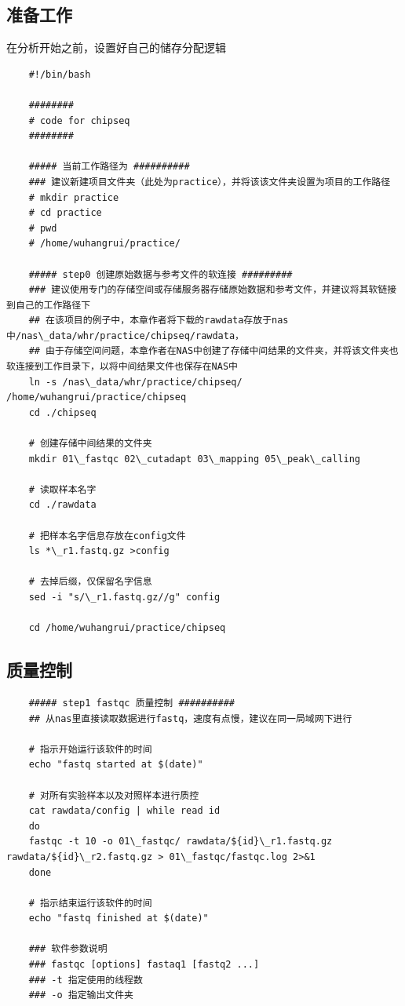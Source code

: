 \subsection{准备工作}
在分析开始之前，设置好自己的储存分配逻辑
\begin{lstlisting}
    #!/bin/bash

    ########
    # code for chipseq
    ########

    ##### 当前工作路径为 ##########
    ### 建议新建项目文件夹（此处为practice），并将该该文件夹设置为项目的工作路径
    # mkdir practice
    # cd practice
    # pwd
    # /home/wuhangrui/practice/

    ##### step0 创建原始数据与参考文件的软连接 #########
    ### 建议使用专门的存储空间或存储服务器存储原始数据和参考文件，并建议将其软链接到自己的工作路径下
    ## 在该项目的例子中，本章作者将下载的rawdata存放于nas中/nas\_data/whr/practice/chipseq/rawdata，
    ## 由于存储空间问题，本章作者在NAS中创建了存储中间结果的文件夹，并将该文件夹也软连接到工作目录下，以将中间结果文件也保存在NAS中
    ln -s /nas\_data/whr/practice/chipseq/ /home/wuhangrui/practice/chipseq
    cd ./chipseq

    # 创建存储中间结果的文件夹 
    mkdir 01\_fastqc 02\_cutadapt 03\_mapping 05\_peak\_calling

    # 读取样本名字
    cd ./rawdata

    # 把样本名字信息存放在config文件
    ls *\_r1.fastq.gz >config

    # 去掉后缀，仅保留名字信息
    sed -i "s/\_r1.fastq.gz//g" config

    cd /home/wuhangrui/practice/chipseq
\end{lstlisting}

\subsection{质量控制}
\begin{lstlisting}
    ##### step1 fastqc 质量控制 ##########
    ## 从nas里直接读取数据进行fastq，速度有点慢，建议在同一局域网下进行

    # 指示开始运行该软件的时间
    echo "fastq started at $(date)"

    # 对所有实验样本以及对照样本进行质控
    cat rawdata/config | while read id
    do
    fastqc -t 10 -o 01\_fastqc/ rawdata/${id}\_r1.fastq.gz rawdata/${id}\_r2.fastq.gz > 01\_fastqc/fastqc.log 2>&1
    done

    # 指示结束运行该软件的时间
    echo "fastq finished at $(date)"

    ### 软件参数说明
    ### fastqc [options] fastaq1 [fastq2 ...] 
    ### -t 指定使用的线程数
    ### -o 指定输出文件夹
\end{lstlisting}

